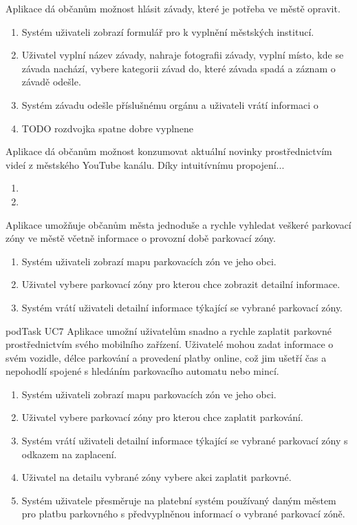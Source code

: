 Aplikace dá občanům možnost hlásit závady, které je potřeba ve městě opravit.

\begin{enumerate}
  \item Systém uživateli zobrazí formulář pro k vyplnění městských institucí.
  \item Uživatel vyplní název závady, nahraje fotografii závady, vyplní místo, kde se závada nachází, vybere kategorii závad do, které závada spadá a 
  záznam o závadě odešle.
  \item Systém závadu odešle příslušnému orgánu a uživateli vrátí informaci o 
  
  \item TODO rozdvojka spatne dobre vyplnene
\end{enumerate}

Aplikace dá občanům možnost konzumovat aktuální novinky prostřednictvím videí z městského YouTube kanálu. Díky intuitívnímu propojení...

\begin{enumerate}
  \item 
  \item 
\end{enumerate}

Aplikace umožňuje občanům města jednoduše a rychle vyhledat veškeré parkovací zóny ve městě včetně informace o provozní době parkovací zóny.

\begin{enumerate}
  \item Systém uživateli zobrazí mapu parkovacích zón ve jeho obci.
  \item Uživatel vybere parkovací zóny pro kterou chce zobrazit detailní informace.
  \item Systém vrátí uživateli detailní informace týkající se vybrané parkovací zóny.
\end{enumerate}

  podTask UC7
Aplikace umožní uživatelům snadno a rychle zaplatit parkovné prostřednictvím svého mobilního zařízení. Uživatelé mohou zadat informace o svém vozidle, 
délce parkování a provedení platby online, což jim ušetří čas a nepohodlí spojené s hledáním parkovacího automatu nebo mincí.

\begin{enumerate}
  \item Systém uživateli zobrazí mapu parkovacích zón ve jeho obci.
  \item Uživatel vybere parkovací zóny pro kterou chce zaplatit parkování.
  \item Systém vrátí uživateli detailní informace týkající se vybrané parkovací zóny s odkazem na zaplacení.
  \item Uživatel na detailu vybrané zóny vybere akci zaplatit parkovné.
  \item Systém uživatele přesměruje na platební systém používaný daným městem pro platbu parkovného s předvyplněnou informací o vybrané parkovací zóně.
\end{enumerate}

